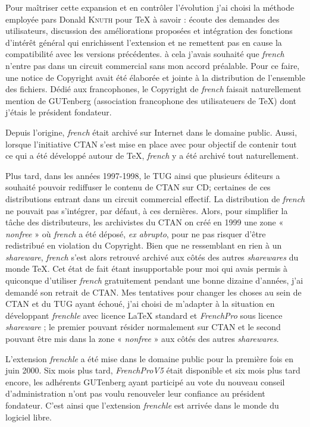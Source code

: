 \documentclass[a4paper,12pt,openright]{article}
\begin{document}
Pour maîtriser cette expansion et en contrôler l’évolution j’ai choisi la méthode
employée pars Donald \textsc{Knuth} pour \TeX{} à savoir : écoute des demandes des
utilisateurs, discussion des améliorations proposées et intégration des fonctions
d’intérêt général qui enrichissent l’extension et ne remettent pas en cause la
compatibilité avec les versions précédentes. à cela j’avais souhaité que \textsl{french}
n’entre pas dans un circuit commercial sans mon accord préalable. Pour ce faire,
une notice de Copyright avait été élaborée et jointe à la distribution de l’ensemble
des fichiers. Dédié aux francophones, le Copyright de \textsl{french} faisait naturellement
mention de GUTenberg (association francophone des utilisateuers
de \TeX) dont j’étais le président fondateur.

Depuis l’origine, \textsl{french} était archivé sur Internet dans le domaine public.
Aussi, lorsque l’initiative CTAN s’est mise en place avec pour objectif de contenir
tout ce qui a été développé autour de \TeX, \textsl{french} y a été archivé tout
naturellement.

Plus tard, dans les années 1997-1998, le TUG ainsi que plusieurs éditeurs a
souhaité pouvoir rediffuser le contenu de CTAN sur CD; certaines de ces distributions
entrant dans un circuit commercial effectif. La distribution de \textsl{french} ne
pouvait pas s’intégrer, par défaut, à ces dernières. Alors, pour simplifier la tâche
des distributeurs, les archivistes du CTAN on créé en 1999 une zone « \textit{nonfree} »
où \textsl{french} a été déposé, \textit{ex abrupto}, pour ne pas risquer d’être redistribué en
violation du Copyright. Bien que ne ressemblant en rien à un \textit{shareware}, \textsl{french}
s’est alors retrouvé archivé aux côtés des autres \textit{sharewares} du monde \TeX. Cet
état de fait étant insupportable pour moi qui avais permis à quiconque d’utiliser
\textsl{french} gratuitement pendant une bonne dizaine d’années, j’ai demandé son
retrait de CTAN. Mes tentatives pour changer les choses au sein de CTAN et
du TUG ayant échoué, j’ai choisi de m’adapter à la situation en développant
\textit{frenchle} avec licence \LaTeX{} standard et \textsl{FrenchPro} 
sous licence \textit{shareware} ; le
premier pouvant résider normalement sur CTAN et le second pouvant être mis
dans la zone « \textit{nonfree} » aux côtés des autres \textit{sharewares}.

L’extension \textit{frenchle} a été mise dans le domaine public pour la première
fois en juin 2000. Six mois plus tard, \textsl{FrenchProV5}  était disponible et six mois
plus tard encore, les adhérents GUTenberg ayant participé au vote du nouveau
conseil d’administration n’ont pas voulu renouveler leur confiance au président
fondateur. C’est ainsi que l’extension \textit{frenchle} est arrivée dans le monde du
logiciel libre.
\end{document}
